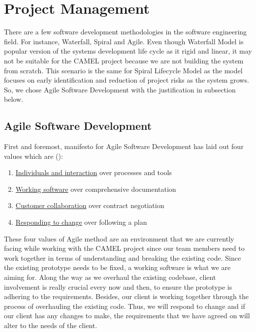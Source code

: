 \section{Project Management}
		There are a few software development methodologies in the software engineering field. For instance, Waterfall, Spiral and Agile. Even though Waterfall Model is popular version of the systems development life cycle as it rigid and linear, it may not be suitable for the CAMEL project because we are not building the system from scratch. This scenario is the same for Spiral Lifecycle Model as the model focuses on early identification and reduction of project risks as the system grows. So, we chose Agile Software Development with the justification in subsection below.
		
		\subsection*{Agile Software Development}
			First and foremost, manifesto for Agile Software Development has laid out four values which are (\cite{agileArtOfDevelopment}):
			
			\begin{enumerate}[i]
				\item \underline{Individuals and interaction} over processes and tools
				\item \underline{Working software} over comprehensive documentation
				\item \underline{Customer collaboration} over contract negotiation
				\item \underline{Responding to change} over following a plan
			\end{enumerate}
			
			These four values of Agile method are an environment that we are currently facing while working with the CAMEL project since our team members need to work together in terms of understanding and breaking the existing code. Since the existing prototype needs to be fixed, a working software is what we are aiming for. Along the way as we overhaul the existing codebase, client involvement is really crucial every now and then, to ensure the prototype is adhering to the requirements. Besides, our client is working together through the process of overhauling the existing code. Thus, we will respond to change and if our client has any changes to make, the requirements that we have agreed on will alter to the needs of the client.  
			
